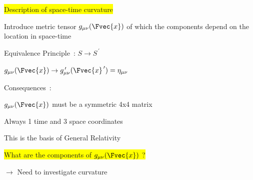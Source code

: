 \newpage

\begin{itemize}
\item[] \begin{center}\colorbox{yellow}{Description of space-time curvature}\end{center}
{\red
\item[] Introduce metric tensor $g_{\mu\nu}(\Fvec{x})$ of which the components
        depend on the location in space-time 
}
\item Equivalence Principle~: $S \rightarrow S^{\,\prime}$
\item[] $g_{\mu\nu}(\Fvec{x}) \rightarrow g_{\mu\nu}^{\,\prime}(\Fvec{x}^{\,\prime})=\eta_{\mu\nu}$
\item Consequences~:
{\blue
\item[] $g_{\mu\nu}(\Fvec{x})$ must be a symmetric 4x4 matrix
\item[] Always 1 time and 3 space coordinates
}
\item[$\ast$] This is the basis of {\red General Relativity}
\item[] \colorbox{yellow}{What are the components of $g_{\mu\nu}(\Fvec{x})$ ?}
\item[] $\rightarrow$ Need to investigate curvature
\end{itemize}